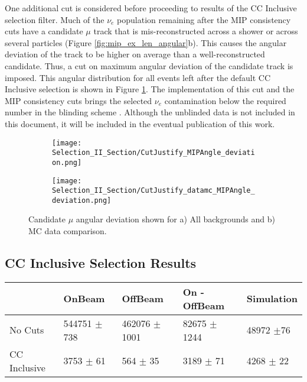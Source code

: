 One additional cut is considered before proceeding to results of the CC Inclusive selection filter.  Much of the $\nu_e$ population remaining after the MIP consistency cuts have a candidate $\mu$ track that is mis-reconstructed across a shower or across several particles (Figure \ref{fig:mip_ex_len_angular}b).  This causes the angular deviation of the track to be higher on average than a well-reconstructed candidate.  Thus, a cut on maximum angular deviation of the candidate track is imposed.  This angular distribution for all events left after the default CC Inclusive selection is shown in Figure \ref{fig:cutjust_sel2_multall_deviation}.  The implementation of this cut and the MIP consistency cuts brings the selected $\nu_e$ contamination below the required number in the blinding scheme \cite{bib:jz_unblinding_note}. Although the unblinded data is not included in this document, it will be included in the eventual publication of this work.
\begin{figure}[H]
  \begin{subfigure}[t]{0.35\textwidth}
\texttt{[image: Selection\_II\_Section/CutJustify\_MIPAngle\_deviation.png]}
    \caption{ }
  \end{subfigure} 
  \hspace{15mm}
  \begin{subfigure}[t]{0.35\textwidth}
\texttt{[image: Selection\_II\_Section/CutJustify\_datamc\_MIPAngle\_deviation.png]}
    \caption{ }
  \end{subfigure} 
\caption{ Candidate $\mu$ angular deviation shown for a) All backgrounds and b) MC data comparison. }
\label{fig:cutjust_sel2_multall_deviation}
\end{figure}

\clearpage

\subsection{CC Inclusive Selection Results}

\begin{table}[H]
 \centering
 \begin{tabular}{| l | l | l | l | l |}
  \hline
   & OnBeam & OffBeam & On - OffBeam & Simulation \\ [0.1ex] \hline
No Cuts & 544751 $\pm$ 738 & 462076 $\pm$ 1001 & 82675 $\pm$ 1244 & 48972 $\pm$76 \\ 
CC Inclusive & 3753 $\pm$ 61 & 564 $\pm$ 35 & 3189 $\pm$ 71 & 4268 $\pm$ 22  \\ \hline

\end{tabular}
 \end{table}

